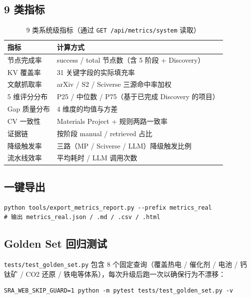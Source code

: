 \documentclass[11pt,a4paper]{article}
\begin{document}
\subsection{9 类指标}

\begin{table}[h]
\centering
\small
\caption{9 类系统级指标（通过 \texttt{GET /api/metrics/system} 读取）}
\begin{tabular}{@{}lp{8cm}@{}}
\toprule
\textbf{指标} & \textbf{计算方式} \\
\midrule
节点完成率 & success / total 节点数（含 5 阶段 + Discovery） \\
KV 覆盖率 & 31 关键字段的实际填充率 \\
文献抓取率 & arXiv / S2 / Sciverse 三源命中率加权 \\
5 维评分分布 & P25 / 中位数 / P75（基于已完成 Discovery 的项目）\\
Gap 质量分布 & 4 维度的均值与方差 \\
CV 一致性 & Materials Project + 规则两路一致率 \\
证据链 & 按阶段 manual / retrieved 占比 \\
降级触发率 & 三路（MP / Sciverse / LLM）降级触发比例 \\
流水线效率 & 平均耗时 / LLM 调用次数 \\
\bottomrule
\end{tabular}
\end{table}

\subsection{一键导出}

\begin{verbatim}
python tools/export_metrics_report.py --prefix metrics_real
# 输出 metrics_real.json / .md / .csv / .html
\end{verbatim}

\subsection{Golden Set 回归测试}

\texttt{tests/test\_golden\_set.py} 包含 8 个固定查询（覆盖热电 / 催化剂 / 电池 / 钙钛矿 / CO2 还原 / 铁电等体系），每次升级后跑一次以确保行为不漂移：

\begin{verbatim}
SRA_WEB_SKIP_GUARD=1 python -m pytest tests/test_golden_set.py -v
\end{verbatim}
\end{document}
